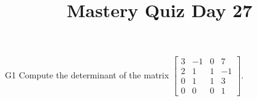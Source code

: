 \documentclass{sbgLAquiz}
\title{Mastery Quiz Day 27 }
\begin{document}
\begin{problem}{G1}
Compute the determinant of the matrix $\begin{bmatrix} 3 & -1 & 0  & 7 \\ 2 & 1 & 1 & -1  \\ 0 & 1 & 1 & 3 \\ 0 & 0 & 0 & 1   \end{bmatrix}$.
\end{problem}
\end{document}
